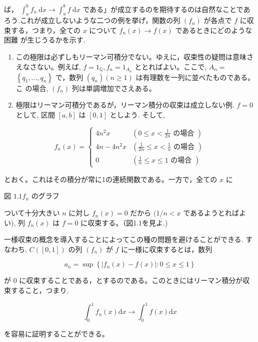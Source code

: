 \documentclass[14pt]{jsarticle}
\begin{document}
ば， $\int_{a}^{b} f_{n} \mathrm{~d} x \rightarrow \int_{a}^{b} f \mathrm{~d} x$ である」が成立するのを期待するのは自然なことであ ろう.これが成立しないような二つの例を挙げ，関数の列 $\left(f_{n}\right)$ が各点で $f$ に収束する，つまり，全ての $x$ について $f_{n}(x) \rightarrow f(x)$ であるときにどのような困難 が生じうるかを示す.

\begin{enumerate}
  \item この極限は必ずしもリーマン可積分でない。ゆえに，収束性の疑問は意味さえなさない。例えば, $f=1_{\mathbb{Q}}, f_{n}=1_{A_{n}}$ ととればよい。ここで, $A_{n}=$ $\left\{q_{1}, \ldots, q_{n}\right\}$ で，数列 $\left(q_{n}\right)(n \geq 1)$ は有理数を一列に並べたものである。こ の場合, $\left(f_{n}\right)$ 列は単調増加でさえある。

  \item 極限はリーマン可積分であるが，リーマン積分の収束は成立しない例. $f=0$ として, 区間 $[a, b]$ は $[0,1]$ としよう. そして,

\end{enumerate}

$$
f_{n}(x)=\left\{\begin{array}{cl}
4 n^{2} x & \left(0 \leq x<\frac{1}{2 n} \text { の場合 }\right) \\
4 n-4 n^{2} x & \left(\frac{1}{2 n} \leq x<\frac{1}{n} \text { の場合 }\right) \\
0 & \left(\frac{1}{n} \leq x \leq 1 \text { の場合 }\right)
\end{array}\right.
$$

とおく。これはその積分が常に1の連続関数である。一方で，全ての $x$ に


図 $1.1 f_{n}$ のグラフ

ついて十分大きい $n$ に対し $f_{n}(x)=0$ だから $(1 / n<x$ であるようとればよ い), 列 $f_{n}(x)$ は $f=0$ に収束する。（図1.1を見よ.)

一様収束の概念を導入することによってこの種の問題を避けることができる. すなわち, $C([0,1])$ の列 $\left(f_{n}\right)$ が $f$ に一様に収束するとは，数列

$$
a_{n}=\sup \left\{\left|f_{n}(x)-f(x)\right|: 0 \leq x \leq 1\right\}
$$

が 0 に収束することである，とするのである。このときにはリーマン積分が収束すること，つまり,

$$
\int_{0}^{1} f_{n}(x) \mathrm{d} x \rightarrow \int_{0}^{1} f(x) \mathrm{d} x
$$

を容易に証明することができる。
\end{document}
